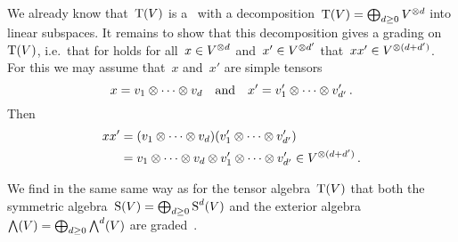 \section{}





\subsection{}
\label{grading on tensor algebra}

We already know that~$\operatorname{T}(V)$ is a~{\kalg} with a decomposition~$\operatorname{T}(V) = \bigoplus_{d \geq 0} V^{\otimes d}$ into linear subspaces.
It remains to show that this decomposition gives a grading on~$\operatorname{T}(V)$, i.e.\ that for holds for all~$x \in V^{\otimes d}$ and~$x' \in V^{\otimes d'}$ that~$x x' \in V^{\otimes (d + d')}$.
For this we may assume that~$x$ and~$x'$ are simple tensors
\[
    x
  = v_1 \otimes \dotsb \otimes v_d
  \quad\text{and}\quad
    x'
  = v'_1 \otimes \dotsb \otimes v'_{d'} \,.
\]
Then
\begin{align*}
      x x'
  &=  (v_1 \otimes \dotsb \otimes v_d) (v'_1 \otimes \dotsb \otimes v'_{d'})  \\
  &=  v_1 \otimes \dotsb \otimes v_d \otimes v'_1 \otimes \dotsb \otimes v'_{d'}
  \in V^{\otimes (d + d')} \,.
\end{align*}


\begin{remark}
  We find in the same same way as for the tensor algebra~$\operatorname{T}(V)$ that both the symmetric algebra~$\operatorname{S}(V) = \bigoplus_{d \geq 0} \operatorname{S}^d(V)$ and the exterior algebra~$\bigwedge(V) = \bigoplus_{d \geq 0} \bigwedge^d(V)$ are graded~{\kalgs}.
\end{remark}





\subsection{}


